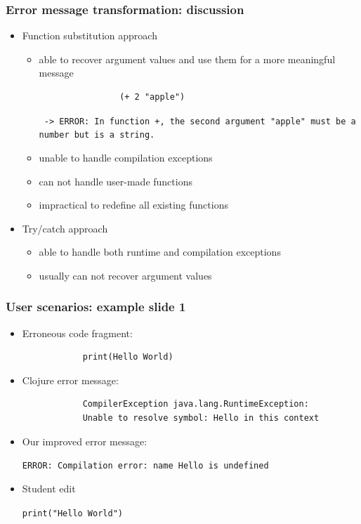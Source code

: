 \documentclass{beamer}
\begin{document}
\begin{frame}[fragile]
\frametitle{Error message transformation: discussion}

	\begin{itemize}
		\item Function substitution approach
			\begin{itemize}
				\item able to recover argument values and use them for a more meaningful message
				\begin{verbatim}
				(+ 2 "apple")
				\end{verbatim}
				\textcolor{PrettyGreen}{
				\texttt{
				-> ERROR: In function +, the second argument
				"apple" must be a number but is a string.
				}}
				\item unable to handle compilation exceptions
				\item can not handle user-made functions
				\item impractical to redefine all existing functions
			\end{itemize}
		\item Try/catch approach
			\begin{itemize}
	 			\item able to handle both runtime and compilation exceptions
				\item usually can not recover argument values
	 		\end{itemize} 
	\end{itemize}
\end{frame}

\begin{frame}[fragile]
\frametitle{User scenarios: example slide 1}

	\begin{itemize}
		\item Erroneous code fragment:
			\begin{verbatim}
			print(Hello World)
			\end{verbatim}
			
		\item Clojure error message:
			\begin{verbatim}
			CompilerException java.lang.RuntimeException:
			Unable to resolve symbol: Hello in this context
			\end{verbatim}
			
		\item Our improved error message:
		
			\textcolor{PrettyGreen}{
			\texttt{ERROR: Compilation error: name Hello is undefined}
			}
		\item Student edit
		
				\texttt{print(\alert{"Hello World"})}
	\end{itemize}
	
\end{frame}
\end{document}
